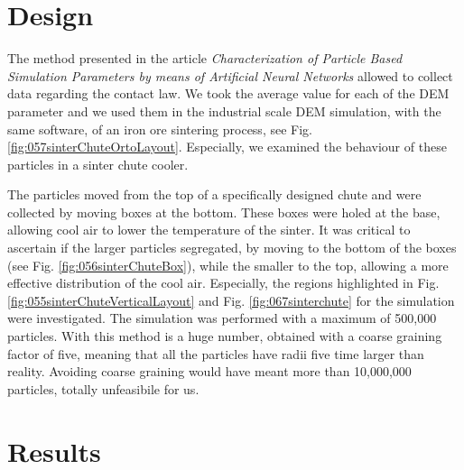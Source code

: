 

\section{Design}
\label{sec:design}



The method presented in the article \textit{Characterization of Particle Based Simulation Parameters
by means of Artificial Neural Networks} allowed to collect data
regarding the contact law. We took the average value for each of the DEM parameter and we used them 
in the industrial scale DEM simulation, with the same software, 
of an iron ore sintering process, see Fig. \ref{fig:057sinterChuteOrtoLayout}.
Especially, we examined the behaviour of these particles in a sinter chute cooler.



The particles moved from the top of a specifically designed chute and were 
collected by moving boxes at the bottom. These boxes were holed at the base, 
allowing cool air to lower the temperature of the sinter. 
It was critical to ascertain if the larger particles segregated, 
by moving to the bottom of the boxes (see Fig. \ref{fig:056sinterChuteBox}), while the smaller to the top,
allowing a more effective distribution of the cool air. 
Especially, the regions
highlighted in Fig. \ref{fig:055sinterChuteVerticalLayout} and
Fig. \ref{fig:067sinterchute} for the simulation were investigated.
The simulation was performed with a maximum of 500,000 particles.
With this method is a huge number, obtained with a coarse graining factor of
five, meaning that all the particles have radii five time larger than reality.
Avoiding coarse graining would have meant more than 10,000,000 particles,
totally unfeasibile for us.




\section{Results}
\label{sec:results}


